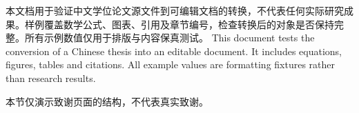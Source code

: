 \documentclass[promaster]{DissertUESTC}
\begin{document}
\zhabstract
本文档用于验证中文学位论文源文件到可编辑文档的转换，不代表任何实际研究成果。样例覆盖数学公式、图表、引用及章节编号，检查转换后的对象是否保持完整。所有示例数值仅用于排版与内容保真测试。
\enabstract
This document tests the conversion of a Chinese thesis into an editable document. It includes equations, figures, tables and citations. All example values are formatting fixtures rather than research results.
\tableofcontents


\acknowledgement
本节仅演示致谢页面的结构，不代表真实致谢。

\end{document}
